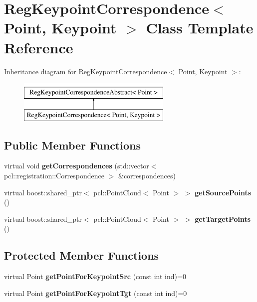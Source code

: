 \hypertarget{classRegKeypointCorrespondence}{
\section{RegKeypointCorrespondence$<$ Point, Keypoint $>$ Class Template Reference}
\label{classRegKeypointCorrespondence}
}
Inheritance diagram for RegKeypointCorrespondence$<$ Point, Keypoint $>$:\begin{figure}[H]
\begin{center}
\leavevmode
\includegraphics[height=2.000000cm]{classRegKeypointCorrespondence}
\end{center}
\end{figure}
\subsection*{Public Member Functions}
\begin{DoxyCompactItemize}
\item 
\hypertarget{classRegKeypointCorrespondence_a297cfea656d891bea94e2d45245a05d9}{
virtual void {\bfseries getCorrespondences} (std::vector$<$ pcl::registration::Correspondence $>$ \&correspondences)}
\label{classRegKeypointCorrespondence_a297cfea656d891bea94e2d45245a05d9}

\item 
\hypertarget{classRegKeypointCorrespondence_ae055e55096e52385a5a91a6f15bf1fc3}{
virtual boost::shared\_\-ptr$<$ pcl::PointCloud$<$ Point $>$ $>$ {\bfseries getSourcePoints} ()}
\label{classRegKeypointCorrespondence_ae055e55096e52385a5a91a6f15bf1fc3}

\item 
\hypertarget{classRegKeypointCorrespondence_ae43d02fb394fb3e7470ae355ddaa92a1}{
virtual boost::shared\_\-ptr$<$ pcl::PointCloud$<$ Point $>$ $>$ {\bfseries getTargetPoints} ()}
\label{classRegKeypointCorrespondence_ae43d02fb394fb3e7470ae355ddaa92a1}

\end{DoxyCompactItemize}
\subsection*{Protected Member Functions}
\begin{DoxyCompactItemize}
\item 
\hypertarget{classRegKeypointCorrespondence_a045fecfd029e9e4f82ba7ce06a24925d}{
virtual Point {\bfseries getPointForKeypointSrc} (const int ind)=0}
\label{classRegKeypointCorrespondence_a045fecfd029e9e4f82ba7ce06a24925d}

\item 
\hypertarget{classRegKeypointCorrespondence_a6b5e53daa87597446ec19cfb41e227f7}{
virtual Point {\bfseries getPointForKeypointTgt} (const int ind)=0}
\label{classRegKeypointCorrespondence_a6b5e53daa87597446ec19cfb41e227f7}

\end{DoxyCompactItemize}
